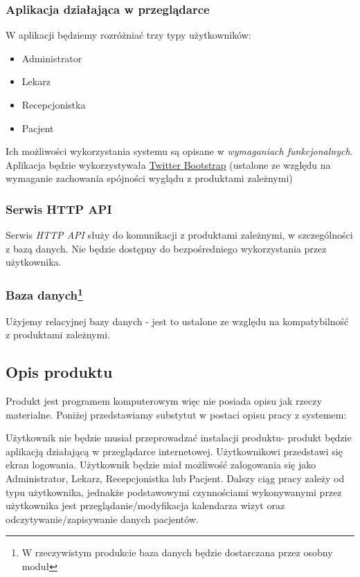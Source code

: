 \documentclass[polish,12pt]{aghthesis}
\begin{document}
\subsubsection{Aplikacja działająca w przeglądarce}

W aplikacji będziemy rozróżniać trzy typy użytkowników:
\begin{itemize}
    \item Administrator
    \item Lekarz
    \item Recepcjonistka
    \item Pacjent
\end{itemize}
Ich możliwości wykorzystania systemu są opisane w \emph{wymaganiach funkcjonalnych}. Aplikacja będzie wykorzystywała \href{https://getbootstrap.com/}{Twitter Bootstrap} (ustalone ze względu na wymaganie zachowania spójności wyglądu z produktami zależnymi)

\subsubsection{Serwis HTTP API}
Serwis \emph{HTTP API} służy do komunikacji z produktami zależnymi, w szczególności z bazą danych. Nie będzie dostępny do bezpośredniego wykorzystania przez użytkownika.

\subsubsection[Baza danych]{Baza danych\footnote{W rzeczywistym produkcie baza danych będzie dostarczana przez osobny moduł}}

Użyjemy relacyjnej bazy danych - jest to ustalone ze względu na kompatybilność z produktami zależnymi.

\subsection{Opis produktu}
Produkt jest programem komputerowym więc nie posiada opisu jak rzeczy materialne. Poniżej przedstawiamy substytut w postaci opisu pracy z systemem:

Użytkownik nie będzie musiał przeprowadzać instalacji produktu- produkt będzie aplikacją działającą w przeglądarce internetowej. Użytkownikowi przedstawi się ekran logowania. Użytkownik będzie miał możliwość zalogowania się jako Administrator, Lekarz, Recepcjonistka lub Pacjent. Dalszy ciąg pracy zależy od typu użytkownika, jednakże podstawowymi czynnościami wykonywanymi przez użytkownika jest przeglądanie/modyfikacja kalendarza wizyt oraz odczytywanie/zapisywanie danych pacjentów.
\end{document}

